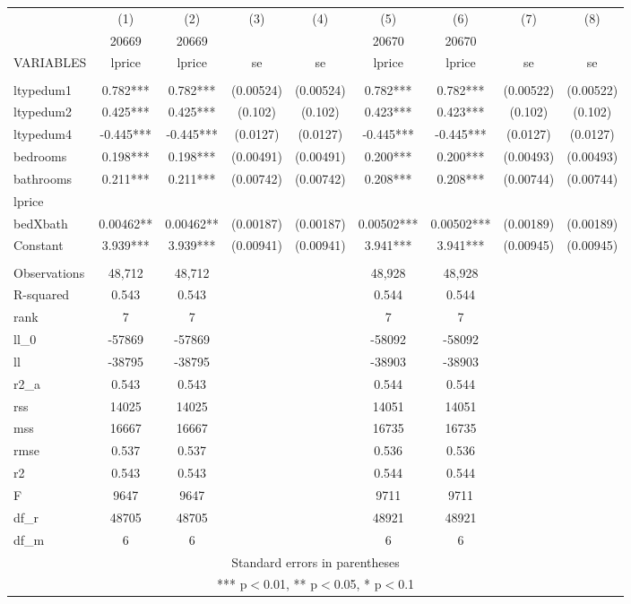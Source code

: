 \documentclass[]{article}
\begin{document}
\begin{tabular}{lcccccccc} \hline
 & (1) & (2) & (3) & (4) & (5) & (6) & (7) & (8) \\
 & 20669 & 20669 &  &  & 20670 & 20670 &  &  \\
VARIABLES & lprice & lprice & se & se & lprice & lprice & se & se \\ \hline
 &  &  &  &  &  &  &  &  \\
ltypedum1 & 0.782*** & 0.782*** & (0.00524) & (0.00524) & 0.782*** & 0.782*** & (0.00522) & (0.00522) \\
ltypedum2 & 0.425*** & 0.425*** & (0.102) & (0.102) & 0.423*** & 0.423*** & (0.102) & (0.102) \\
ltypedum4 & -0.445*** & -0.445*** & (0.0127) & (0.0127) & -0.445*** & -0.445*** & (0.0127) & (0.0127) \\
bedrooms & 0.198*** & 0.198*** & (0.00491) & (0.00491) & 0.200*** & 0.200*** & (0.00493) & (0.00493) \\
bathrooms & 0.211*** & 0.211*** & (0.00742) & (0.00742) & 0.208*** & 0.208*** & (0.00744) & (0.00744) \\
lprice &  &  &  &  &  &  &  &  \\
bedXbath & 0.00462** & 0.00462** & (0.00187) & (0.00187) & 0.00502*** & 0.00502*** & (0.00189) & (0.00189) \\
Constant & 3.939*** & 3.939*** & (0.00941) & (0.00941) & 3.941*** & 3.941*** & (0.00945) & (0.00945) \\
 &  &  &  &  &  &  &  &  \\
Observations & 48,712 & 48,712 &  &  & 48,928 & 48,928 &  &  \\
R-squared & 0.543 & 0.543 &  &  & 0.544 & 0.544 &  &  \\
rank & 7 & 7 &  &  & 7 & 7 &  &  \\
ll\_0 & -57869 & -57869 &  &  & -58092 & -58092 &  &  \\
ll & -38795 & -38795 &  &  & -38903 & -38903 &  &  \\
r2\_a & 0.543 & 0.543 &  &  & 0.544 & 0.544 &  &  \\
rss & 14025 & 14025 &  &  & 14051 & 14051 &  &  \\
mss & 16667 & 16667 &  &  & 16735 & 16735 &  &  \\
rmse & 0.537 & 0.537 &  &  & 0.536 & 0.536 &  &  \\
r2 & 0.543 & 0.543 &  &  & 0.544 & 0.544 &  &  \\
F & 9647 & 9647 &  &  & 9711 & 9711 &  &  \\
df\_r & 48705 & 48705 &  &  & 48921 & 48921 &  &  \\
 df\_m & 6 & 6 &  &  & 6 & 6 &  &  \\ \hline
\multicolumn{9}{c}{ Standard errors in parentheses} \\
\multicolumn{9}{c}{ *** p$<$0.01, ** p$<$0.05, * p$<$0.1} \\
\end{tabular}
\end{document}

